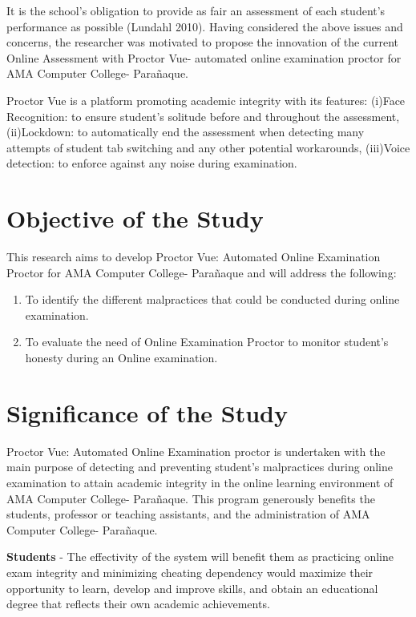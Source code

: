 It is the school’s obligation to provide as fair an assessment of each student’s performance as possible (Lundahl 2010).
Having considered the above issues and concerns, the researcher was motivated to propose the innovation of the current Online Assessment with Proctor Vue- automated online examination proctor for AMA Computer College- Parañaque.

Proctor Vue is a platform promoting academic integrity with its features: (i)Face Recognition: to ensure student’s solitude before and throughout the assessment, (ii)Lockdown: to automatically end the assessment when detecting many attempts of student tab switching and any other potential workarounds, (iii)Voice detection: to enforce against any noise during examination.

\section{Objective of the Study}
This research aims to develop Proctor Vue: Automated Online Examination Proctor for AMA Computer College- Parañaque and will address the following:
\begin{enumerate}
    \item To identify the different malpractices that could be conducted during online examination.
    \item To evaluate the need of Online Examination Proctor to monitor student's honesty during an Online examination.
\end{enumerate}

\section{Significance of the Study}

Proctor Vue: Automated Online Examination proctor is undertaken with the main purpose of detecting and preventing student’s malpractices during online examination to attain academic integrity in the online learning environment of AMA Computer College- Parañaque. This program generously benefits the students, professor or teaching assistants, and the administration of AMA Computer College- Parañaque.

\textbf{Students} - The effectivity of the system will benefit them as practicing online exam integrity and minimizing cheating dependency would maximize their opportunity to learn, develop and improve skills, and obtain an educational degree that reflects their own academic achievements.

